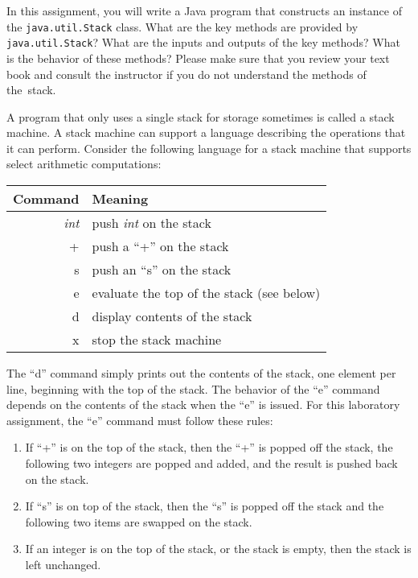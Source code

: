   In this assignment, you will write a Java program that constructs an instance of the {\tt java.util.Stack} class. What
  are the key methods are provided by {\tt java.util.Stack}? What are the inputs and outputs of the key methods? What is
  the behavior of these methods? Please make sure that you review your text book and consult the instructor if you do
  not understand the methods of \mbox{the stack}.
  
  A program that only uses a single stack for storage sometimes is called a stack machine. A stack machine can support a
  language describing the operations that it can perform. Consider the following language for a stack machine that
  supports select arithmetic computations:

\begin{tabular}{r | l}
Command & Meaning \\ \hline
\emph{int} & push \emph{int} on the stack \\
+ & push a ``+'' on the stack \\
s & push an ``s'' on the stack \\
e & evaluate the top of the stack (see below) \\
d & display contents of the stack \\
x & stop the stack machine \\ 
\end{tabular}

  The ``d'' command simply prints out the contents of the stack, one element per line, beginning with the top of the
  stack. The behavior of the ``e'' command depends on the contents of the stack when the ``e'' is issued. For this
  laboratory assignment, the ``e'' command must follow these rules:

\begin{enumerate}

  \item If ``+'' is on the top of the stack, then the ``+'' is popped off the stack, the following two integers are popped
    and added, and the result is pushed back on the stack.  
  
  \item If ``s'' is on top of the stack, then the ``s'' is popped off the stack and the following two items are swapped
    on the stack.  
  
  \item If an integer is on the top of the stack, or the stack is empty, then the stack is left unchanged.  

\end{enumerate}

